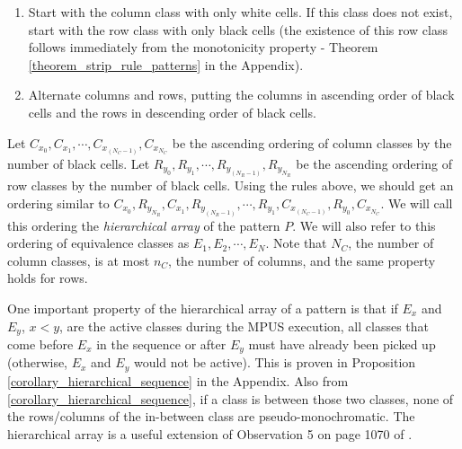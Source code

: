 \begin{enumerate}

\item Start with the column class with only white cells. If this class does not exist, start with the row class with only black cells  (the existence of
this row class follows immediately from the monotonicity property -
Theorem \ref{theorem_strip_rule_patterns} in the Appendix).

\item Alternate columns and rows, putting the columns in ascending order of black cells and the rows in descending order of black cells.

\end{enumerate}

Let $C_{x_{0}}, C_{x_{1}}, \cdots, C_{x_{(N_{C}-1)}}, C_{x_{N_{C}}}$ be the ascending ordering of column classes by the number of black cells. Let $R_{y_{0}}, R_{y_{1}}, \cdots, R_{y_{(N_{R}-1)}}, R_{y_{N_{R}}}$ be the ascending ordering of row classes by the number of black cells. Using the rules above, we should get an ordering similar to $C_{x_{0}}, R_{y_{N_{R}}}, C_{x_{1}}, R_{y_{(N_{R}-1)}}, \cdots, R_{y_{1}}, C_{x_{(N_{C}-1)}}, R_{y_{0}}, C_{x_{N_{C}}}$. We will call this ordering the {\em hierarchical array} of the pattern $P$. We will also refer to this ordering of equivalence classes as $E_{1}, E_{2}, \cdots, E_{N}$.
Note that $N_C$, the number of column classes, is at most $n_C$,
the number of columns, and the same property holds for rows.

One important property of the hierarchical array of a pattern is that if $E_{x}$ and $E_{y}$, $x < y$, are the active classes during the MPUS execution, all classes that come before $E_{x}$ in the sequence or after $E_{y}$ must have already been picked up (otherwise, $E_{x}$ and $E_{y}$ would not be active).
This is proven in Proposition \ref{corollary_hierarchical_sequence}
in the Appendix.
Also from \ref{corollary_hierarchical_sequence}, if a class is between those two classes, none of the rows/columns of the in-between class
are pseudo-monochromatic.
The hierarchical array is a useful extension of Observation 5 on page
1070 of \cite{ACJKLW07}.
